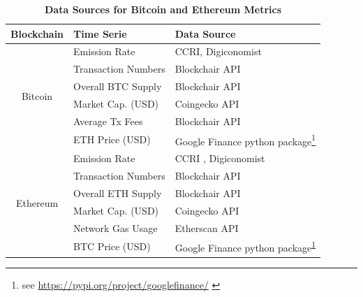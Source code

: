 \documentclass[11pt]{report}
\begin{document}
\begin{table}[h!]
    \centering
    \caption{\textbf{Data Sources for Bitcoin and Ethereum Metrics}}
    \begin{tabular}{|c|l|l|}
        \hline
        \textbf{Blockchain}       & \textbf{Time Serie}  & \textbf{Data Source}                                                                                          \\
        \hline
        \multirow{6}{*}{Bitcoin}  & Emission Rate        & CCRI\cite{ccriCryptocurrencySustainabilityAPI}, Digiconomist                                                  \\
                                  & Transaction Numbers  & Blockchair API \cite{blockchairltdBlockchainAPIDocumentation}                                                 \\
                                  & Overall BTC Supply   & Blockchair API\cite{blockchairltdBlockchainAPIDocumentation}                                                  \\
                                  & Market Cap. (USD)    & Coingecko API \cite{coingeckoltdCryptoAPIDocumentation}                                                       \\
                                  & Average \ac{Tx} Fees & Blockchair API \cite{blockchairltdBlockchainAPIDocumentation}                                                 \\
                                  & ETH Price (USD)      & Google Finance python package\footnote{see \url{https://pypi.org/project/googlefinance/} \label{ft:gfinance}} \\
        \hline
        \multirow{6}{*}{Ethereum} & Emission Rate        & CCRI \cite{ccriCryptocurrencySustainabilityAPI}, Digiconomist                                                 \\
                                  & Transaction Numbers  & Blockchair API \cite{etherscanltdAPIDocumentation}                                                            \\
                                  & Overall ETH Supply   & Blockchair API \cite{blockchairltdBlockchainAPIDocumentation}                                                 \\
                                  & Market Cap. (USD)    & Coingecko API \cite{coingeckoltdCryptoAPIDocumentation}                                                       \\
                                  & Network Gas Usage    & Etherscan API \cite{etherscanltdAPIDocumentation}                                                             \\
                                  & BTC Price (USD)      & Google Finance python package\textsuperscript{\ref{ft:gfinance}}                                              \\
        \hline
    \end{tabular}
\end{table}
\end{document}
